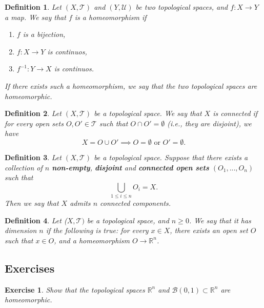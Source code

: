 \documentclass[a4paper,11pt]{article}
\theoremstyle{mytheor}
\newtheorem{definition}{Definition}[subsection]
\theoremstyle{mytheor}
\newtheorem{exercise}{Exercise}
\theoremstyle{remark}
\newcommand{\T}{\mathcal{T}}
\newcommand{\U}{\mathcal{U}}
\newcommand{\B}{\mathcal{B}}
\newcommand{\R}{\mathbb{R}}
\begin{document}
\begin{definition}
    Let $(X, \T)$ and $(Y, \U)$ be two topological spaces, and $f : X
    \to Y$ a map. We say that $f$ is a homeomorphism if
    \begin{enumerate}
        \item $f$ is a bijection, 
        \item $f : X \to Y$ is continuos, 
        \item $f^{-1} : Y \to X$ is continuos.
    \end{enumerate}
    If there exists such a homeomorphism, we say that the two topological
    spaces are homeomorphic.
\end{definition}

\begin{definition}
    Let $(X, \T)$ be a topological space. We say that $X$ is connected if for
    every open sets $O, O' \in \T$ such that $O \cap O' = \emptyset$ (i.e.,
    they are disjoint), we have
    $$X = O \cup O' \implies O = \emptyset \text{ or } O' = \emptyset.$$
\end{definition}

\begin{definition}
    Let $(X, \T)$ be a topological space. Suppose that there exists a
    collection of $n$ \textbf{non-empty}, \textbf{disjoint} and
    \textbf{connected open sets} $(O_1, ..., O_n)$ such that
    $$
    \bigcup_{1 \le i \le n} O_i = X.
    $$
    Then we say that $X$ admits $n$ connected components.
\end{definition}

\begin{definition}
    Let ($X, \T)$ be a topological space, and $n \geq 0$. We say that it has
    dimension $n$ if the following is true: for every $x \in X$, there exists
    an open set $O$ such that $x \in O$, and a homeomorphism $O \to \R^n$.
\end{definition}

\subsection{Exercises}

\begin{exercise}
    Show that the topological spaces $\R^n$ and $\B(0, 1) \subset \R^n$ are homeomorphic.
\end{exercise}
\end{document}
